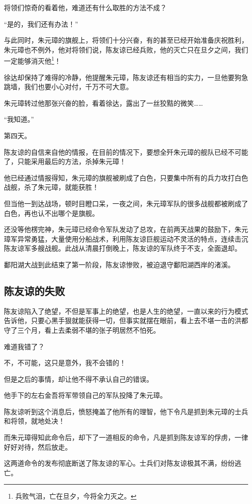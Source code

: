 \begin{multicols}{\theparacolNo}
		将领们惊奇的看着他，难道还有什么取胜的方法不成？

		“是的，我们还有办法！”

		与此同时，朱元璋的旗舰上，将领们十分兴奋，有的甚至已经开始准备庆祝胜利，朱元璋也不例外，他对将领们说，陈友谅已经兵败，他的灭亡只在旦夕之间，我们一定能够消灭他\footnote{兵败气沮，亡在旦夕，今将全力灭之。}！

		徐达却保持了难得的冷静，他提醒朱元璋，陈友谅还有相当的实力，一旦他要狗急跳墙，我们也要小心对付，千万不可大意。

		朱元璋转过他那张兴奋的脸，看着徐达，露出了一丝狡黠的微笑……

		“我知道。”

		第四天。

		陈友谅的自信来自他的情报，在目前的情况下，要想全歼朱元璋的舰队已经不可能了，只能采用最后的方法，杀掉朱元璋！

		他已经通过情报得知，朱元璋的旗舰被刷成了白色，只要集中所有的兵力攻打白色战舰，杀了朱元璋，就能获胜！

		但当他一到达战场，顿时目瞪口呆，一夜之间，朱元璋军队的很多战舰都被刷成了白色，再也认不出哪个是旗舰。

		还没等他楞完神，朱元璋已经命令军队发动了总攻，在前两天战果的鼓励下，朱元璋军异常勇猛，大量使用分船战术，利用陈友谅巨舰运动不灵活的特点，连续击沉陈友谅军多艘战舰。此战从清晨打倒晚上，陈友谅的军队终于不支，全面退却。

		鄱阳湖大战到此结束了第一阶段，陈友谅惨败，被迫退守鄱阳湖西岸的渚溪。

		\subsection{陈友谅的失败}
		陈友谅陷入了绝望，不但是军事上的绝望，也是人生的绝望，一直以来的行为模式告诉他，只要心黑手狠就能获得一切，但事实就摆在眼前，看上去不堪一击的洪都守了三个月，看上去柔弱不堪的张子明居然不怕死。

		难道我错了？

		不，不可能，这只是意外，我不会错的！

		但是之后的事情，却让他不得不承认自己的错误。

		他手下的左右金吾将军带领自己的军队投降了朱元璋。

		陈友谅听到这个消息后，愤怒掩盖了他所有的理智，他下令凡是抓到朱元璋的士兵和将领，就地处决！

		而朱元璋得知此命令后，却下了一道相反的命令，凡是抓到陈友谅军的俘虏，一律好好对待，然后放走。

		这两道命令的发布彻底断送了陈友谅的军心。士兵们对陈友谅极其不满，纷纷逃亡。


\end{multicols}
